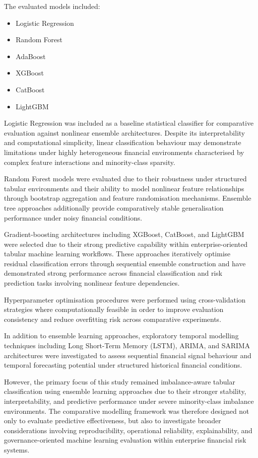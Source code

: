 \documentclass{article}
\begin{document}
The evaluated models included:

\begin{itemize}
    \item Logistic Regression
    \item Random Forest
    \item AdaBoost
    \item XGBoost
    \item CatBoost
    \item LightGBM
\end{itemize}

Logistic Regression was included as a baseline statistical classifier for comparative evaluation against nonlinear ensemble architectures. Despite its interpretability and computational simplicity, linear classification behaviour may demonstrate limitations under highly heterogeneous financial environments characterised by complex feature interactions and minority-class sparsity.

Random Forest models were evaluated due to their robustness under structured tabular environments and their ability to model nonlinear feature relationships through bootstrap aggregation and feature randomisation mechanisms. Ensemble tree approaches additionally provide comparatively stable generalisation performance under noisy financial conditions.

Gradient-boosting architectures including XGBoost, CatBoost, and LightGBM were selected due to their strong predictive capability within enterprise-oriented tabular machine learning workflows. These approaches iteratively optimise residual classification errors through sequential ensemble construction and have demonstrated strong performance across financial classification and risk prediction tasks involving nonlinear feature dependencies.

Hyperparameter optimisation procedures were performed using cross-validation strategies where computationally feasible in order to improve evaluation consistency and reduce overfitting risk across comparative experiments.

In addition to ensemble learning approaches, exploratory temporal modelling techniques including Long Short-Term Memory (LSTM), ARIMA, and SARIMA architectures were investigated to assess sequential financial signal behaviour and temporal forecasting potential under structured historical financial conditions.

However, the primary focus of this study remained imbalance-aware tabular classification using ensemble learning approaches due to their stronger stability, interpretability, and predictive performance under severe minority-class imbalance environments. The comparative modelling framework was therefore designed not only to evaluate predictive effectiveness, but also to investigate broader considerations involving reproducibility, operational reliability, explainability, and governance-oriented machine learning evaluation within enterprise financial risk systems.
\end{document}
